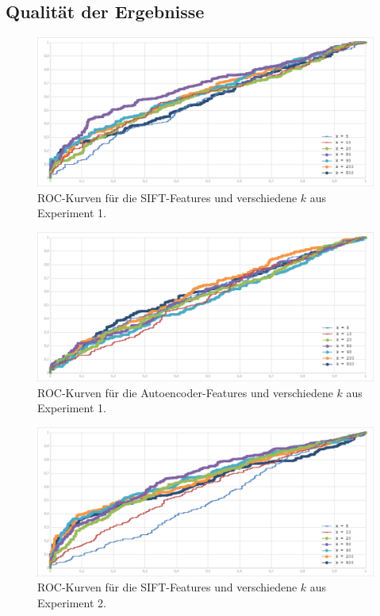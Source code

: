 \subsection{Qualität der Ergebnisse}

\begin{figure}
	\centering
	\includegraphics[scale=0.56]{images/exp1_roc128.png}
	\caption{ROC-Kurven für die SIFT-Features und verschiedene $k$ aus Experiment 1.}
	\label{img:roc1}
\end{figure}

\begin{figure}
	\centering
	\includegraphics[scale=0.56]{images/exp1_roc36.png}
	\caption{ROC-Kurven für die Autoencoder-Features und verschiedene $k$ aus Experiment 1.}
	\label{img:roc2}
\end{figure}

\begin{figure}
	\centering
	\includegraphics[scale=0.56]{images/exp2_roc128.png}
	\caption{ROC-Kurven für die SIFT-Features und verschiedene $k$ aus Experiment 2.}
	\label{img:roc3}
\end{figure}

